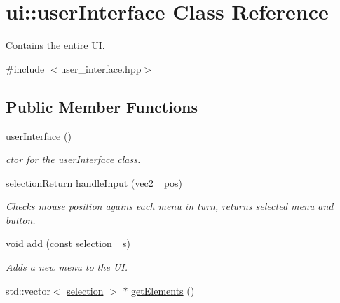 \hypertarget{classui_1_1user_interface}{\section{ui\-:\-:user\-Interface Class Reference}
\label{classui_1_1user_interface}
}


Contains the entire U\-I.  




{\ttfamily \#include $<$user\-\_\-interface.\-hpp$>$}

\subsection*{Public Member Functions}
\begin{DoxyCompactItemize}
\item 
\hypertarget{classui_1_1user_interface_ac23b546b6ac290af709dd1e1caf209aa}{\hyperlink{classui_1_1user_interface_ac23b546b6ac290af709dd1e1caf209aa}{user\-Interface} ()}\label{classui_1_1user_interface_ac23b546b6ac290af709dd1e1caf209aa}

\begin{DoxyCompactList}\small\item\em ctor for the \hyperlink{classui_1_1user_interface}{user\-Interface} class. \end{DoxyCompactList}\item 
\hyperlink{structui_1_1selection_return}{selection\-Return} \hyperlink{classui_1_1user_interface_a538308770df303f863b988055481dc0b}{handle\-Input} (\hyperlink{structvec2}{vec2} \-\_\-pos)
\begin{DoxyCompactList}\small\item\em Checks mouse position agains each menu in turn, returns selected menu and button. \end{DoxyCompactList}\item 
void \hyperlink{classui_1_1user_interface_a87be3b4a18dffe7c2a8e3de6ee5d49db}{add} (const \hyperlink{classui_1_1selection}{selection} \-\_\-s)
\begin{DoxyCompactList}\small\item\em Adds a new menu to the U\-I. \end{DoxyCompactList}\item 
\hypertarget{classui_1_1user_interface_a1b89247e7deaf5874d58c36e6d571bd3}{std\-::vector$<$ \hyperlink{classui_1_1selection}{selection} $>$ $\ast$ \hyperlink{classui_1_1user_interface_a1b89247e7deaf5874d58c36e6d571bd3}{get\-Elements} ()}\label{classui_1_1user_interface_a1b89247e7deaf5874d58c36e6d571bd3}


\end{DoxyCompactItemize}
